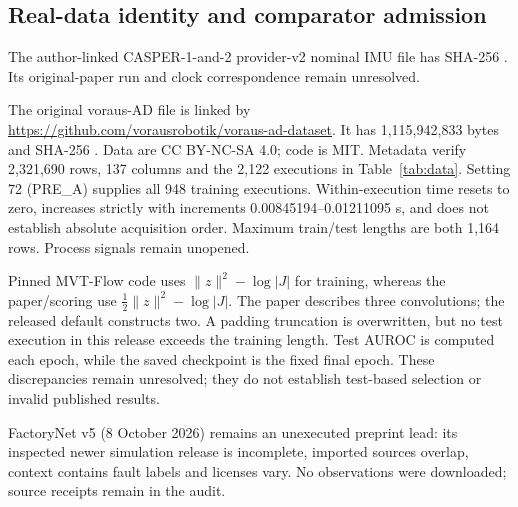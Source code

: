 \subsection{Real-data identity and comparator admission}
The author-linked CASPER-1-and-2 provider-v2 nominal IMU file has SHA-256 . Its original-paper run and clock correspondence remain unresolved.

The original voraus-AD file is linked by \url{https://github.com/vorausrobotik/voraus-ad-dataset}. It has 1,115,942,833 bytes and SHA-256 . Data are CC BY-NC-SA 4.0; code is MIT. Metadata verify 2,321,690 rows, 137 columns and the 2,122 executions in Table~\ref{tab:data}. Setting 72 (PRE\_A) supplies all 948 training executions. Within-execution time resets to zero, increases strictly with increments 0.00845194--0.01211095 s, and does not establish absolute acquisition order. Maximum train/test lengths are both 1,164 rows. Process signals remain unopened.

Pinned MVT-Flow code  uses $\|z\|^2-\log|J|$ for training, whereas the paper/scoring use $\tfrac12\|z\|^2-\log|J|$. The paper describes three convolutions; the released default constructs two. A padding truncation is overwritten, but no test execution in this release exceeds the training length. Test AUROC is computed each epoch, while the saved checkpoint is the fixed final epoch. These discrepancies remain unresolved; they do not establish test-based selection or invalid published results.

FactoryNet v5 (8 October 2026) remains an unexecuted preprint lead: its inspected newer simulation release is incomplete, imported sources overlap, context contains fault labels and licenses vary. No observations were downloaded; source receipts remain in the audit.
